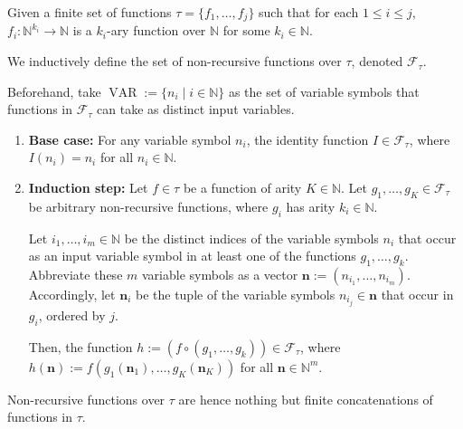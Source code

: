

\begin{definition}
	\label{def:non-recursive-functions}
	Given a finite set of functions $\tau=\{f_1,\dots,f_j\}$ such that for each $1\leq i\leq j$, $f_i:\mathbb{N}^{k_{i}}\to\mathbb{N}$ is a $k_i$-ary function over $\mathbb{N}$ for some $k_i\in\mathbb{N}$.
	
	We inductively define the set of non-recursive functions over $\tau$, denoted $\mathcal{F}_{\tau}$.
	
	Beforehand, take $\operatorname{VAR}:=\{n_i\mid i\in\mathbb{N}\}$ as the set of variable symbols that functions in $\mathcal{F}_{\tau}$ can take as distinct input variables.
	\begin{enumerate}
		\item \textbf{Base case:} For any variable symbol $n_i$, the identity function $I\in \mathcal{F}_{\tau}$, where $I(n_i)=n_i$ for all $n_i\in\mathbb{N}$.
		\item \textbf{Induction step:} Let $f\in\tau$ be a function of arity $K\in\mathbb{N}$. Let $g_1,\dots,g_K\in\mathcal{F}_{\tau}$ be arbitrary non-recursive functions, where $g_i$ has arity $k_i\in\mathbb{N}$. 
		
		Let $i_1,\dots,i_m\in\mathbb{N}$ be the distinct indices of the variable symbols $n_i$ that occur as an input variable symbol in at least one of the functions $g_1,\dots,g_k$. 
		Abbreviate these $m$ variable symbols as a vector $\mathbf{n}:=(n_{i_1},\dots,n_{i_m})$. Accordingly, let $\mathbf{n}_i$ be the tuple of the variable symbols $n_{i_j}\in \mathbf{n}$ that occur in $g_i$, ordered by $j$. 
		
		Then, the function $h:=(f\circ(g_1,\dots,g_k))\in \mathcal{F}_{\tau}$, where $h(\mathbf{n}):=f(g_1(\mathbf{n}_1),\dots,g_K(\mathbf{n}_K))$ for all $\mathbf{n}\in\mathbb{N}^m$.
	\end{enumerate}
\end{definition}
Non-recursive functions over $\tau$ are hence nothing but finite concatenations of functions in $\tau$.

